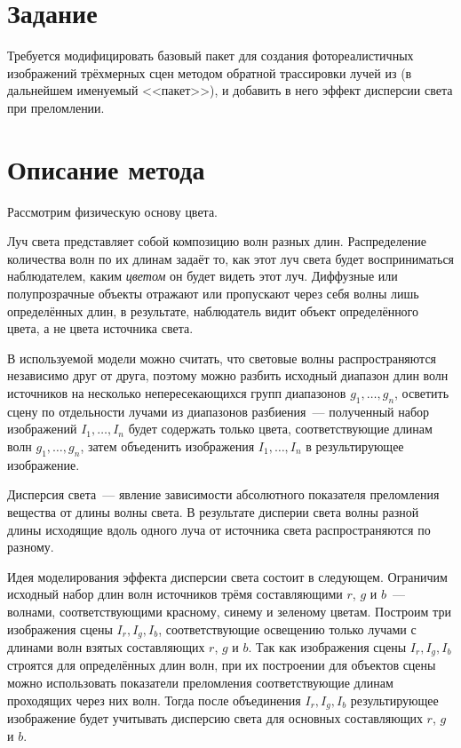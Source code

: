 \documentclass[a4paper,10pt]{article}
\begin{document}




\section{Задание}
Требуется модифицировать базовый пакет для создания фотореалистичных изображений трёхмерных сцен 
методом обратной трассировки лучей из \cite{shikin1995cg} (в дальнейшем именуемый <<пакет>>),
и добавить в него эффект дисперсии света при преломлении.

\section{Описание метода}
Рассмотрим физическую основу цвета.

Луч света представляет собой композицию волн разных длин.
Распределение количества волн по их длинам задаёт то, 
как этот луч света будет восприниматься наблюдателем, 
каким \textit{цветом} он будет видеть этот луч.
Диффузные или полупрозрачные объекты отражают или пропускают через себя волны лишь определённых длин,
в результате, наблюдатель видит объект определённого цвета, а не цвета источника света.

В используемой модели можно считать, 
что световые волны распространяются независимо друг от друга, 
поэтому можно разбить исходный диапазон длин волн источников 
на несколько непересекающихся групп диапазонов $g_1, \ldots, g_n$, 
осветить сцену по отдельности лучами из диапазонов разбиения~--- 
полученный набор изображений $I_1, \ldots, I_n$ будет содержать только цвета, 
соответствующие длинам волн $g_1, \ldots, g_n$, 
затем объеденить изображения $I_1, \ldots, I_n$ в результирующее изображение.

Дисперсия света~--- явление зависимости абсолютного показателя преломления вещества от длины волны света.
В результате дисперии света волны разной длины исходящие вдоль одного луча от источника света 
распространяются по разному.

Идея моделирования эффекта дисперсии света состоит в следующем.
Ограничим исходный набор длин волн источников трёмя составляющими $r$, $g$ и $b$~---
волнами, соответствующими красному, синему и зеленому цветам.
Построим три изображения сцены $I_r, I_g, I_b$, соответствующие
освещению только лучами с длинами волн взятых составляющих $r$, $g$ и $b$.
Так как изображения сцены $I_r, I_g, I_b$ строятся для определённых длин волн, 
при их построении для объектов сцены можно использовать показатели преломления соответствующие длинам
проходящих через них волн.
Тогда после объединения $I_r, I_g, I_b$ результирующее изображение будет учитывать дисперсию света для
основных составляющих $r$, $g$ и $b$.
\end{document}
